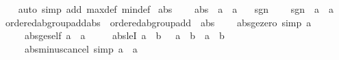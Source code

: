 \begin{isabellebody}
%
\isadelimproof
\ \ %
\endisadelimproof
%
\isatagproof
{}\isamarkupfalse%
\ {\isacharparenleft}{\kern0pt}auto\ simp\ add{\isacharcolon}{\kern0pt}\ max{\isacharunderscore}{\kern0pt}def\ min{\isacharunderscore}{\kern0pt}def{\isacharparenright}{\kern0pt}%
\endisatagproof
{\isafoldproof}%
%
\isadelimproof
\isanewline
%
\endisadelimproof
\isanewline
{}\isamarkupfalse%
\isanewline
\isanewline
{}\isamarkupfalse%
\ abs\ {\isacharequal}{\kern0pt}\isanewline
\ \ \ abs\ {\isacharcolon}{\kern0pt}{\isacharcolon}{\kern0pt}\ {\isachardoublequoteopen}{\isacharprime}{\kern0pt}a\ {\isasymRightarrow}\ {\isacharprime}{\kern0pt}a{\isachardoublequoteclose}\ \ {\isacharparenleft}{\kern0pt}{\isachardoublequoteopen}{\isasymbar}{\isacharunderscore}{\kern0pt}{\isasymbar}{\isachardoublequoteclose}{\isacharparenright}{\kern0pt}\isanewline
\isanewline
{}\isamarkupfalse%
\ sgn\ {\isacharequal}{\kern0pt}\isanewline
\ \ \ sgn\ {\isacharcolon}{\kern0pt}{\isacharcolon}{\kern0pt}\ {\isachardoublequoteopen}{\isacharprime}{\kern0pt}a\ {\isasymRightarrow}\ {\isacharprime}{\kern0pt}a{\isachardoublequoteclose}\isanewline
\isanewline
{}\isamarkupfalse%
\ ordered{\isacharunderscore}{\kern0pt}ab{\isacharunderscore}{\kern0pt}group{\isacharunderscore}{\kern0pt}add{\isacharunderscore}{\kern0pt}abs\ {\isacharequal}{\kern0pt}\ ordered{\isacharunderscore}{\kern0pt}ab{\isacharunderscore}{\kern0pt}group{\isacharunderscore}{\kern0pt}add\ {\isacharplus}{\kern0pt}\ abs\ {\isacharplus}{\kern0pt}\isanewline
\ \ \ abs{\isacharunderscore}{\kern0pt}ge{\isacharunderscore}{\kern0pt}zero\ {\isacharbrackleft}{\kern0pt}simp{\isacharbrackright}{\kern0pt}{\isacharcolon}{\kern0pt}\ {\isachardoublequoteopen}{\isasymbar}a{\isasymbar}\ {\isasymge}\ {}{\isachardoublequoteclose}\isanewline
\ \ \ \ \ abs{\isacharunderscore}{\kern0pt}ge{\isacharunderscore}{\kern0pt}self{\isacharcolon}{\kern0pt}\ {\isachardoublequoteopen}a\ {\isasymle}\ {\isasymbar}a{\isasymbar}{\isachardoublequoteclose}\isanewline
\ \ \ \ \ abs{\isacharunderscore}{\kern0pt}leI{\isacharcolon}{\kern0pt}\ {\isachardoublequoteopen}a\ {\isasymle}\ b\ {\isasymLongrightarrow}\ {\isacharminus}{\kern0pt}\ a\ {\isasymle}\ b\ {\isasymLongrightarrow}\ {\isasymbar}a{\isasymbar}\ {\isasymle}\ b{\isachardoublequoteclose}\isanewline
\ \ \ \ \ abs{\isacharunderscore}{\kern0pt}minus{\isacharunderscore}{\kern0pt}cancel\ {\isacharbrackleft}{\kern0pt}simp{\isacharbrackright}{\kern0pt}{\isacharcolon}{\kern0pt}\ {\isachardoublequoteopen}{\isasymbar}{\isacharminus}{\kern0pt}a{\isasymbar}\ {\isacharequal}{\kern0pt}\ {\isasymbar}a{\isasymbar}{\isachardoublequoteclose}\isanewline

\end{isabellebody}
